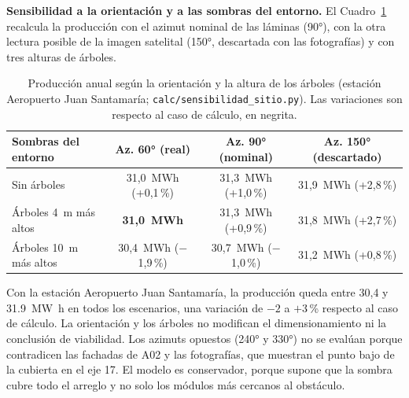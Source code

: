 \documentclass[12pt]{article}
\begin{document}
\textbf{Sensibilidad a la orientación y a las sombras del entorno.} El Cuadro~\ref{tab:sensib_sitio} recalcula la producción con el azimut nominal de las láminas (90°), con la otra lectura posible de la imagen satelital (150°, descartada con las fotografías) y con tres alturas de árboles.

\begin{table}[H]
\centering\small
\caption{Producción anual según la orientación y la altura de los árboles (estación Aeropuerto Juan Santamaría; \texttt{calc/sensibilidad\_sitio.py}). Las variaciones son respecto al caso de cálculo, en negrita.}\label{tab:sensib_sitio}
\setlength{\tabcolsep}{3.8pt}
\begin{tabular}{@{}lccc@{}}
\toprule
\textbf{Sombras del entorno} & \textbf{Az. 60° (real)} & \textbf{Az. 90° (nominal)} & \textbf{Az. 150° (descartado)}\\
\midrule
Sin árboles & 31,0~MWh (+0,1\,\%) & 31,3~MWh (+1,0\,\%) & 31,9~MWh (+2,8\,\%)\\
Árboles 4~m más altos & \textbf{31,0~MWh} & 31,3~MWh (+0,9\,\%) & 31,8~MWh (+2,7\,\%)\\
Árboles 10~m más altos & 30,4~MWh ($-$1,9\,\%) & 30,7~MWh ($-$1,0\,\%) & 31,2~MWh (+0,8\,\%)\\
\bottomrule
\end{tabular}
\end{table}

Con la estación Aeropuerto Juan Santamaría, la producción queda entre 30,4 y \SI{31.9}{\mega\watt\hour} en todos los escenarios, una variación de $-2$ a $+3$\,\% respecto al caso de cálculo. La orientación y los árboles no modifican el dimensionamiento ni la conclusión de viabilidad. Los azimuts opuestos (240° y 330°) no se evalúan porque contradicen las fachadas de A02 y las fotografías, que muestran el punto bajo de la cubierta en el eje 17. El modelo es conservador, porque supone que la sombra cubre todo el arreglo y no solo los módulos más cercanos al obstáculo.
\end{document}
